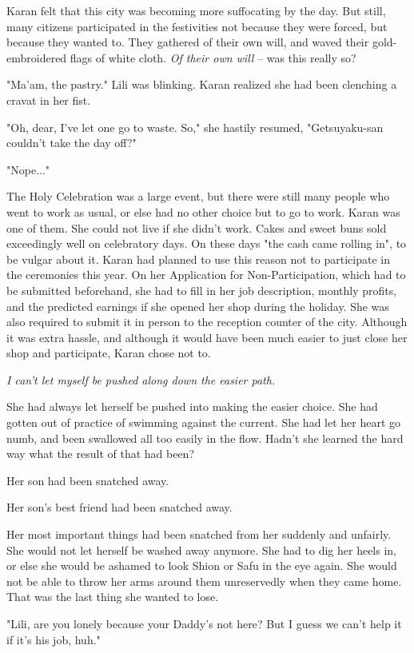 Karan felt that this city was becoming more suffocating by the day. But
still, many citizens participated in the festivities not because they
were forced, but because they wanted to. They gathered of their own
will, and waved their gold-embroidered flags of white cloth. \emph{Of their
own will} -- was this really so?

"Ma'am, the pastry." Lili was blinking. Karan realized she had been
clenching a cravat in her fist.

"Oh, dear, I've let one go to waste. So," she hastily resumed,
"Getsuyaku-san couldn't take the day off?"

"Nope..."

The Holy Celebration was a large event, but there were still many people
who went to work as usual, or else had no other choice but to go to
work. Karan was one of them. She could not live if she didn't work.
Cakes and sweet buns sold exceedingly well on celebratory days. On these
days "the cash came rolling in", to be vulgar about it. Karan had
planned to use this reason not to participate in the ceremonies this
year. On her Application for Non-Participation, which had to be
submitted beforehand, she had to fill in her job description, monthly
profits, and the predicted earnings if she opened her shop during the
holiday. She was also required to submit it in person to the reception
counter of the city. Although it was extra hassle, and although it would
have been much easier to just close her shop and participate, Karan
chose not to.

\emph{I can't let myself be pushed along down the easier path.}

She had always let herself be pushed into making the easier choice. She
had gotten out of practice of swimming against the current. She had let
her heart go numb, and been swallowed all too easily in the flow. Hadn't
she learned the hard way what the result of that had been?

Her son had been snatched away.

Her son's best friend had been snatched away.

Her most important things had been snatched from her suddenly and
unfairly. She would not let herself be washed away anymore. She had to
dig her heels in, or else she would be ashamed to look Shion or Safu in
the eye again. She would not be able to throw her arms around them
unreservedly when they came home. That was the last thing she wanted to
lose.

"Lili, are you lonely because your Daddy's not here? But I guess we
can't help it if it's his job, huh."

